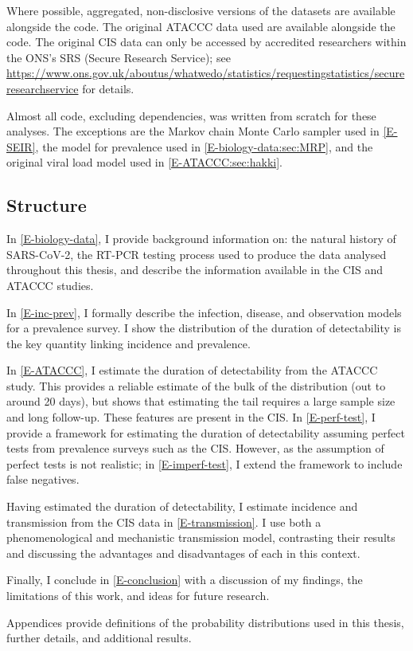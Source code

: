 \documentclass[thesis.tex]{subfiles}
\begin{document}
Where possible, aggregated, non-disclosive versions of the datasets are available alongside the code.
The original ATACCC data used are available alongside the code.
The original CIS data can only be accessed by accredited researchers within the ONS's SRS (Secure Research Service); see \url{https://www.ons.gov.uk/aboutus/whatwedo/statistics/requestingstatistics/secureresearchservice} for details.

Almost all code, excluding dependencies, was written from scratch for these analyses.
The exceptions are the Markov chain Monte Carlo sampler used in \cref{E-SEIR}, the model for prevalence used in \cref{E-biology-data:sec:MRP}, and the original viral load model used in \cref{E-ATACCC:sec:hakki}.

\subsection{Structure}

In \cref{E-biology-data}, I provide background information on: the natural history of SARS-CoV-2, the RT-PCR testing process used to produce the data analysed throughout this thesis, and describe the information available in the CIS and ATACCC studies.

In \cref{E-inc-prev}, I formally describe the infection, disease, and observation models for a prevalence survey.
I show the distribution of the duration of detectability is the key quantity linking incidence and prevalence.

In \cref{E-ATACCC}, I estimate the duration of detectability from the ATACCC study.
This provides a reliable estimate of the bulk of the distribution (out to around 20 days),  but shows that estimating the tail requires a large sample size and long follow-up. 
These features are present in the CIS.
In \cref{E-perf-test}, I provide a framework for estimating the duration of detectability assuming perfect tests from prevalence surveys such as the CIS.
However, as the assumption of perfect tests is not realistic; in \cref{E-imperf-test}, I extend the framework to include false negatives.

Having estimated the duration of detectability, I estimate incidence and transmission from the CIS data in \cref{E-transmission}.
I use both a phenomenological and mechanistic transmission model, contrasting their results and discussing the advantages and disadvantages of each in this context.

Finally, I conclude in \cref{E-conclusion} with a discussion of my findings, the limitations of this work, and ideas for future research.

Appendices provide definitions of the probability distributions used in this thesis, further details, and additional results.


\ifSubfilesClassLoaded{
  \appendix
%   
  \listoftodos
}{}
\end{document}
